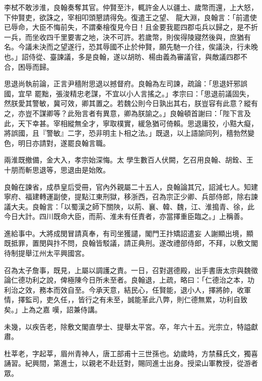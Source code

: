 \begin{pinyinscope}
 李栻不敢涉淮，良翰奏奪其官。仲賢至汴，輒許金人以疆土、歲幣而還，上大怒，下仲賢吏，欲誅之，宰相叩頭懇請得免。復遣王之望、
 龍大淵，良翰言：「前遣使已辱命，大臣不悔前失，不謂秦檜復見今日！且金要我罷四郡屯兵以歸之，是不折一兵，而坐收四千里要害之地，決不可許。若歲幣，則俟得陵寢然後與，庶猶有名。今議未決而之望遂行，恐其辱國不止於仲賢，願先馳一介往，俟議決，行未晚也。」詔侍從、臺諫議，多是良翰，遂以胡昉、楊由義為審議官，與敵議四郡不合，困辱而歸。



 思退尚執前論，正言尹穡附思退以撼督府。良翰為左司諫，疏論：「思退奸邪誤國，宜早
 罷黜，張浚精忠老謀，不宜以小人言搖之。」孝宗曰：「思退前議固失，然朕愛其警敏，冀可效，卿其置之。若魏公則今日孰出其右，朕豈容有此意？縱有之，亦豈不謀卿等？此殆言者有異意，卿為朕諭之。」良翰頓首謝曰：「陛下言及此，天下幸甚。宰相縱無全才，寧取樸實，緩急猶可倚賴。思退庸狡，小黠大癡，將誤國，且『警敏』二字，恐非明主卜相之法。」既退，以上語諭同列，穡勃然變色，明日亦請對，遂罷良翰言職。



 兩淮既撤備，金大入，孝宗始深悔。太
 學生數百人伏闕，乞召用良翰、胡銓、王十朋而斬思退等，思退由是始敗。



 良翰在諫省，成恭皇后受冊，官內外親屬二十五人，良翰論其冗，詔減七人。知建寧府、福建轉運副使，提點江東刑獄，移浙西，召為宗正少卿、兵部侍郎，除右諫議大夫。良翰言：「以蜀漢之師下關陜，以荊、襄、韓、魏，江、淮搗青、徐，此今日大計。四川既命大臣，而荊、淮未有任責者，亦當擇重臣臨之。」上稱善。



 進給事中。大將成閔冒請真奉，有司坐獲譴，閣門王抃矯詔遣妄
 人謝顯出境，顯既抵罪，置閔與抃不問，良翰皆駁議，請正典刑。遂改禮部侍郎，不拜，以敷文閣待制提舉江州太平興國宮。



 召為太子詹事，既見，上屬以調護之責。一日，召對選德殿，出手書唐太宗與魏徵論仁德功利之說，俾極陳今日所未至者。良翰退，上疏，略曰：「仁德治之本，功利治之效，務本而效自至。今承天意，結民心，任賢能，退小人，擇將帥，收軍情，擇監司，吏久任，，皆行之有未至，誠能革此八弊，則仁德無累，功利自致矣。」上為之嘉
 嘆，詔兼侍講。



 未幾，以疾告老，除敷文閣直學士、提舉太平宮。卒，年六十五。光宗立，特謚獻肅。



 杜莘老，字起莘，眉州青神人，唐工部甫十三世孫也。幼歲時，方禁蘇氏文，獨喜誦習。紀興間，第進士，以親老不赴廷對，賜同進士出身。授梁山軍教授，從游者眾。




\end{pinyinscope}
